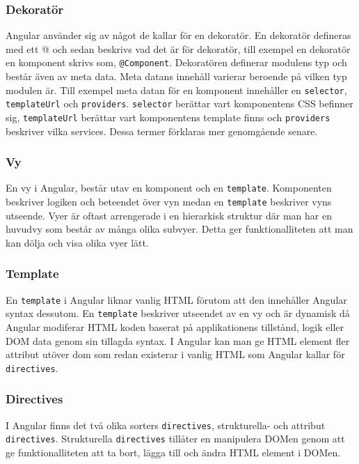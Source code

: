 
\subsubsection{Dekoratör}
Angular använder sig av något de kallar för en dekoratör. En dekoratör defineras med ett @ och sedan beskrivs vad det är för dekoratör, till exempel en dekoratör en komponent skrivs som, \texttt{@Component}.\cite{angular-modules} Dekoratören definerar modulens typ och består även av meta data. Meta datans innehåll varierar beroende på vilken typ modulen är. Till exempel meta datan för en komponent innehåller en \texttt{selector}, \texttt{templateUrl} och \texttt{providers}. \texttt{selector} berättar vart komponentens CSS befinner sig, \texttt{templateUrl} berättar vart komponentens template finns och \texttt{providers} beskriver vilka services. \cite{angular-components} Dessa termer förklaras mer genomgående senare.


\subsubsection{Vy}
En vy i Angular, består utav en komponent och en \texttt{template}. Komponenten beskriver logiken och beteendet över vyn medan en \texttt{template} beskriver vyns utseende. Vyer är oftast arrengerade i en hierarkisk struktur där man har en huvudvy som består av många olika subvyer. Detta ger funktionalliteten att man kan dölja och visa olika vyer lätt. 

\subsubsection{Template}
En \texttt{template} i Angular liknar vanlig HTML förutom att den innehåller Angular syntax dessutom. En \texttt{template} beskriver utseendet av en vy och är dynamisk då Angular modiferar HTML koden baserat på applikationens tillstånd, logik eller DOM data genom sin tillagda syntax.\cite{angular-components} I Angular kan man ge HTML element fler attribut utöver dom som redan existerar i vanlig HTML som Angular kallar för \texttt{directives}.

\subsubsection{Directives}
I Angular finns det två olika sorters \texttt{directives}, strukturella- och attribut \texttt{directives}. Strukturella \texttt{directives} tillåter en manipulera DOMen genom att ge funktionalliteten att ta bort, lägga till och ändra HTML element i DOMen. \cite{angular-services} 

